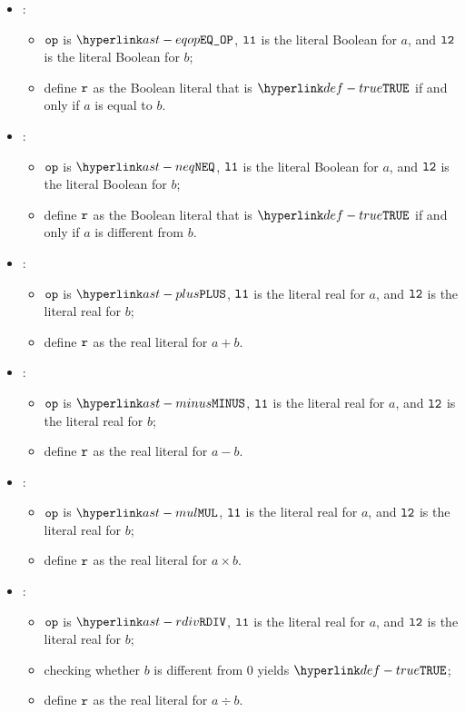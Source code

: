 \begin{itemize}
  \item {}:
  \begin{itemize}
    \item $\texttt{op}$ is $\EQOP$, $\texttt{l1}$ is the literal Boolean for $a$, and $\texttt{l2}$ is the literal Boolean for $b$;
    \item define $\texttt{r}$ as the Boolean literal that is $\True$ if and only if $a$ is equal to $b$.
  \end{itemize}

  \item {}:
  \begin{itemize}
    \item $\texttt{op}$ is $\NEQ$, $\texttt{l1}$ is the literal Boolean for $a$, and $\texttt{l2}$ is the literal Boolean for $b$;
    \item define $\texttt{r}$ as the Boolean literal that is $\True$ if and only if $a$ is different from $b$.
  \end{itemize}

  \item {}:
  \begin{itemize}
    \item $\texttt{op}$ is $\PLUS$, $\texttt{l1}$ is the literal real for $a$, and $\texttt{l2}$ is the literal real for $b$;
    \item define $\texttt{r}$ as the real literal for $a + b$.
  \end{itemize}

  \item {}:
  \begin{itemize}
    \item $\texttt{op}$ is $\MINUS$, $\texttt{l1}$ is the literal real for $a$, and $\texttt{l2}$ is the literal real for $b$;
    \item define $\texttt{r}$ as the real literal for $a - b$.
  \end{itemize}

  \item {}:
  \begin{itemize}
    \item $\texttt{op}$ is $\MUL$, $\texttt{l1}$ is the literal real for $a$, and $\texttt{l2}$ is the literal real for $b$;
    \item define $\texttt{r}$ as the real literal for $a \times b$.
  \end{itemize}

  \item {}:
  \begin{itemize}
    \item $\texttt{op}$ is $\RDIV$, $\texttt{l1}$ is the literal real for $a$, and $\texttt{l2}$ is the literal real for $b$;
    \item checking whether $b$ is different from $0$ yields $\True$\ProseOrTypeError;
    \item define $\texttt{r}$ as the real literal for $a \div b$.
  \end{itemize}


\end{itemize}
